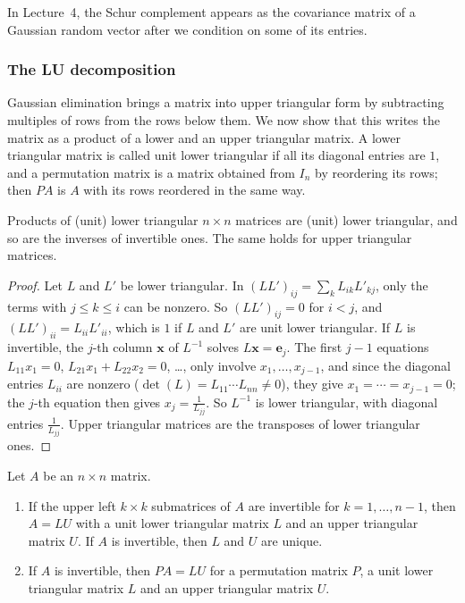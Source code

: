 In Lecture~4, the Schur complement appears as the covariance matrix of a Gaussian random vector after we condition on some of its entries.

\subsubsection{The LU decomposition}

Gaussian elimination brings a matrix into upper triangular form by subtracting multiples of rows from the rows below them. We now show that this writes the matrix as a product of a lower and an upper triangular matrix. A lower triangular matrix is called unit lower triangular if all its diagonal entries are $1$, and a permutation matrix is a matrix obtained from $I_n$ by reordering its rows; then $PA$ is $A$ with its rows reordered in the same way.

\begin{lemma}\label{L1-lem:triangular-products}
    Products of (unit) lower triangular $n \times n$ matrices are (unit) lower triangular, and so are the inverses of invertible ones. The same holds for upper triangular matrices.
\end{lemma}

\begin{proof}
    Let $L$ and $L'$ be lower triangular. In $(LL')_{ij} = \sum_k L_{ik}L'_{kj}$, only the terms with $j \leq k \leq i$ can be nonzero. So $(LL')_{ij} = 0$ for $i < j$, and $(LL')_{ii} = L_{ii}L'_{ii}$, which is $1$ if $L$ and $L'$ are unit lower triangular. If $L$ is invertible, the $j$-th column $\mathbf{x}$ of $L^{-1}$ solves $L\mathbf{x} = \mathbf{e}_j$. The first $j - 1$ equations $L_{11}x_1 = 0$, $L_{21}x_1 + L_{22}x_2 = 0$, \ldots, only involve $x_1, \ldots, x_{j-1}$, and since the diagonal entries $L_{ii}$ are nonzero ($\det(L) = L_{11} \cdots L_{nn} \neq 0$), they give $x_1 = \cdots = x_{j-1} = 0$; the $j$-th equation then gives $x_j = \frac{1}{L_{jj}}$. So $L^{-1}$ is lower triangular, with diagonal entries $\frac{1}{L_{jj}}$. Upper triangular matrices are the transposes of lower triangular ones.
\end{proof}

\begin{theorem}[LU decomposition]\label{L1-thm:lu}
    Let $A$ be an $n \times n$ matrix.
    \begin{enumerate}
        \item If the upper left $k \times k$ submatrices of $A$ are invertible for $k = 1, \ldots, n - 1$, then $A = LU$ with a unit lower triangular matrix $L$ and an upper triangular matrix $U$. If $A$ is invertible, then $L$ and $U$ are unique.
        \item If $A$ is invertible, then $PA = LU$ for a permutation matrix $P$, a unit lower triangular matrix $L$ and an upper triangular matrix $U$.
    \end{enumerate}
\end{theorem}

